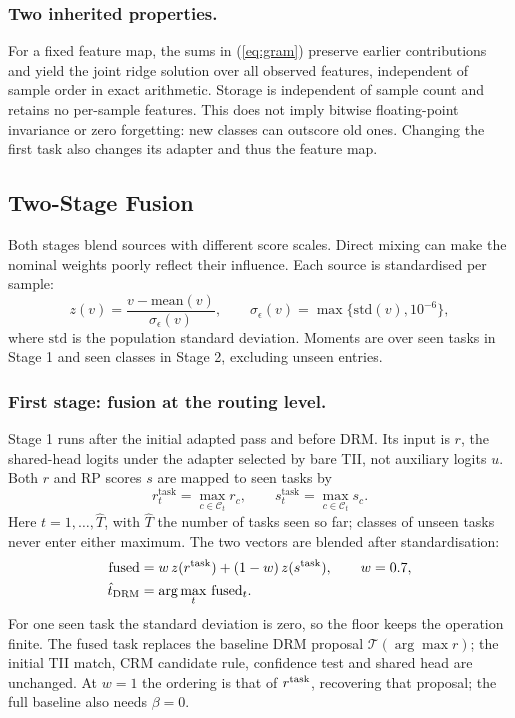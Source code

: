 \documentclass[runningheads]{llncs}
\begin{document}
\subsubsection{Two inherited properties.}
For a fixed feature map, the sums in (\ref{eq:gram}) preserve earlier
contributions and yield the joint ridge solution over all observed features,
independent of sample order in exact arithmetic. Storage is independent of
sample count and retains no per-sample features. This does not imply bitwise
floating-point invariance or zero forgetting: new classes can outscore old
ones. Changing the first task also changes its adapter and thus the feature map.

\subsection{Two-Stage Fusion}

Both stages blend sources with different score scales. Direct mixing can make
the nominal weights poorly reflect their influence. Each source is standardised per sample:
\begin{equation}
z(v) = \frac{v - \mathrm{mean}(v)}{\sigma_\epsilon(v)},
\qquad \sigma_\epsilon(v)=\max\{\mathrm{std}(v),10^{-6}\},
\label{eq:znorm}
\end{equation}
where $\mathrm{std}$ is the population standard deviation. Moments are
over seen tasks in Stage 1 and seen classes in Stage 2, excluding unseen entries.

\subsubsection{First stage: fusion at the routing level.}
Stage 1 runs after the initial adapted pass and before DRM. Its input is $r$,
the shared-head logits under the adapter selected by bare TII, not auxiliary
logits $u$. Both $r$ and RP scores $s$ are mapped to seen tasks by
\[
r^{\mathrm{task}}_t = \max_{c \in \mathcal{C}_t} r_c,
\qquad
s^{\mathrm{task}}_t = \max_{c \in \mathcal{C}_t} s_c .
\]
Here $t = 1,\dots,\hat{T}$, with $\hat{T}$ the number of tasks seen so far; classes
of unseen tasks never enter either maximum. The two vectors are blended after standardisation:
\begin{equation}
\begin{aligned}
\mathrm{fused} &= w\, z(r^{\mathrm{task}})
                 + (1-w)\, z(s^{\mathrm{task}}), \qquad w=0.7,\\
\hat{t}_{\rm DRM} &= \arg\max_t\, \mathrm{fused}_t .
\end{aligned}
\label{eq:route}
\end{equation}
For one seen task the standard deviation is zero, so the floor keeps the
operation finite. The fused task replaces the baseline DRM proposal
$\mathcal T(\arg\max r)$; the initial TII match, CRM candidate rule, confidence
test and shared head are unchanged. At $w=1$ the ordering is that of
$r^{\rm task}$, recovering that proposal; the full baseline also needs $\beta=0$.
\end{document}
